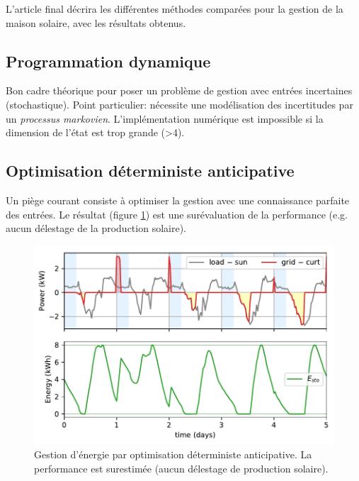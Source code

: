 \documentclass[a4paper,10pt,twocolumn]{article}
\begin{document}
L'article final décrira les différentes méthodes comparées pour la gestion de la maison solaire,
avec les résultats obtenus.

\subsection{Programmation dynamique}
Bon cadre théorique pour poser un problème de gestion avec entrées incertaines (stochastique).
Point particulier: nécessite une modélisation des incertitudes par un \emph{processus markovien}\cite{Haessig:2013:ESPy}.
L'implémentation numérique est impossible si la dimension de l'état est trop grande (>4).


\subsection{Optimisation déterministe anticipative}

Un piège courant consiste à optimiser la gestion avec une connaissance parfaite des entrées.
Le résultat (figure \ref{fig:anticip}) est une surévaluation de la performance (e.g. aucun délestage de la production solaire).


\begin{figure}[!ht]
        \begin{center}
                \includegraphics[width=1\columnwidth]{figures/julia_anticipative.pdf}
        \end{center}

        \caption{Gestion d'énergie par optimisation déterministe anticipative. La performance est surestimée
        (aucun délestage de production solaire).
        }
        \label{fig:anticip}
\end{figure}
\end{document}
